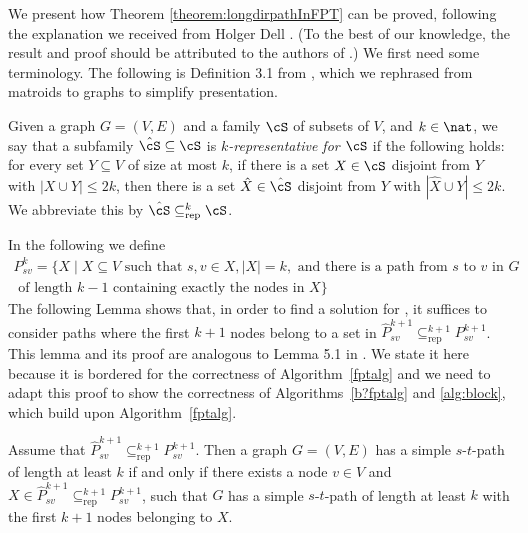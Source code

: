 \documentclass[a4paper,english]{lipics-v2016}
\theoremstyle{plain}
\begin{document}
We present how Theorem \ref{theorem:longdirpathInFPT} can be proved,
following the explanation we received from Holger Dell
\cite{holgercomm}. (To the best of our knowledge, the result and proof should be
attributed to the authors of \cite{fomin}.)  We first need some
terminology. The following is Definition 3.1 from \cite{fomin}, which
we rephrased from matroids to graphs to simplify presentation. \begin{definition} 
  Given a graph $G=(V,E)$ and a family $\cS$ of subsets of $V$, and $k
  \in \nat$, we
    say that a
  subfamily $\hat{\cS} \subseteq \cS$ is \emph{$k$-representative for
    $\cS$} if the following holds: for every set $Y \subseteq V$ of
  size at most $k$, if there is a set $X \in \cS$ disjoint from $Y$
  with $|X \cup Y| \leq 2k$, then there is a set $\hat{X} \in \hat{\cS}$
  disjoint from $Y$ with $|\hat{X} \cup Y|\leq 2k$.  We abbreviate this
  by $\hat{\cS} \subseteq^k_\text{rep} \cS$.
\end{definition}
In the following we define 
\begin{multline*}
  P^k_{sv} = \{X \mid X\subseteq V \text{ such that } s,v \in X,|X| = k, 
   \text{ and there is a path from $s$ to $v$ in } G \\
   \text{ of length } k-1 \text{ containing exactly the nodes in } X\}
\end{multline*}
The following Lemma shows that, in order to find a solution for
\longdirpath, it suffices to consider paths where the first $k+1$
nodes belong to a set in $\hat{P}^{k+1}_{sv} \subseteq^{k+1}_\text{rep}
P^{k+1}_{sv}$. This lemma and its proof are analogous to Lemma 5.1 in
\cite{fomin}. We state it here because it is bordered for the
correctness of Algorithm~\ref{fptalg} and we need to adapt this proof
to show the correctness of Algorithms~\ref{b?fptalg} and
\ref{alg:block}, which build upon
Algorithm~\ref{fptalg}. 
\begin{lemma} \label{proofforfptalg} Assume that $\hat{P}^{k+1}_{sv}
  \subseteq^{k+1}_\text{rep} P^{k+1}_{sv}$. Then a graph $G=(V,E)$ has a
  simple $s$-$t$-path of length at least $k$ if and only if there
  exists a node $v \in V$ and $X \in \hat{P}^{k+1}_{sv}
  \subseteq^{k+1}_\text{rep} P^{k+1}_{sv}$, such that $G$ has a simple
  $s$-$t$-path of length at least $k$ with the first $k+1$ nodes
  belonging to $X$.
\end{lemma}
\end{document}
